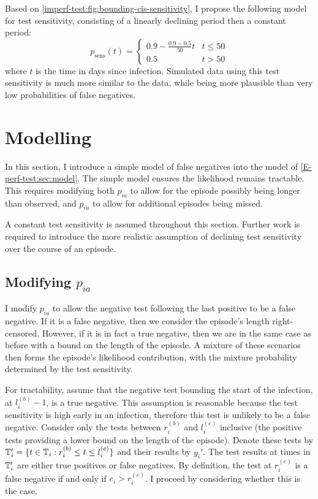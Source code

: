 \documentclass[thesis.tex]{subfiles}
\begin{document}
Based on \cref{imperf-test:fig:bounding-cis-sensitivity}, I propose the following model for test sensitivity, consisting of a linearly declining period then a constant period:
\begin{equation}
  p_\text{sens}(t) = \begin{cases}
    0.9 - \frac{0.9-0.5}{50}t &t \leq 50 \\
    0.5 &t > 50
  \end{cases}
  \label{imperf-test:eq:variable-test-sensitivity}
\end{equation}
where $t$ is the time in days since infection.
Simulated data using this test sensitivity is much more similar to the data, while being more plausible than very low probabilities of false negatives.

\section{Modelling} \label{imperf-test:sec:modelling}

In this section, I introduce a simple model of false negatives into the model of \cref{E-perf-test:sec:model}.
The simple model ensures the likelihood remains tractable.
This requires modifying both $p_{ia}$ to allow for the episode possibly being longer than observed, and $p_{iu}$ to allow for additional episodes being missed.

A constant test sensitivity is assumed throughout this section.
Further work is required to introduce the more realistic assumption of declining test sensitivity over the course of an episode.

\subsection{Modifying \texorpdfstring{$p_{ia}$}{pia}} \label{modifying-p_ia}

I modify $p_{ia}$ to allow the negative test following the last positive to be a false negative.
If it is a false negative, then we consider the episode's length right-censored.
However, if it is in fact a true negative, then we are in the same case as before with a bound on the length of the episode.
A mixture of these scenarios then forms the episode's likelihood contribution, with the mixture probability determined by the test sensitivity.

For tractability, assume that the negative test bounding the start of the infection, at $l_i^{(b)}-1$, is a true negative.
This assumption is reasonable because the test sensitivity is high early in an infection, therefore this test is unlikely to be a false negative.
Consider only the tests between $r_i^{(b)}$ and $l_i^{(e)}$ inclusive (the positive tests providing a lower bound on the length of the episode).
Denote these tests by $\mathbb{T}'_i = \{ t \in \mathbb{T}_i : r_i^{(b)} \leq t \leq l_i^{(e)} \}$ and their results by $y_i'$.
The test results at times in $\mathbb{T}_i'$ are either true positives or false negatives. 
By definition, the test at $r_i^{(e)}$ is a false negative if and only if $e_i > r_i^{(e)}$.
I proceed by considering whether this is the case.
\end{document}
